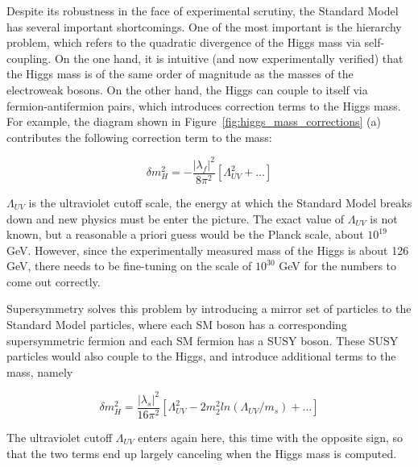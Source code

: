 Despite its robustness in the face of experimental scrutiny, the Standard Model has several important shortcomings.  One of the most important is the hierarchy problem, which refers to the quadratic divergence of the Higgs mass via self-coupling.  On the one hand, it is intuitive (and now experimentally verified) that the Higgs mass is of the same order of magnitude as the masses of the electroweak bosons.  On the other hand, the Higgs can couple to itself via fermion-antifermion pairs, which introduces correction terms to the Higgs mass.  For example, the diagram shown in Figure~\ref{fig:higgs_mass_corrections} (a) contributes the following correction term to the mass:

\begin{equation}
	\delta m_H^2 = -\frac{|\lambda_f |^2}{8\pi^2}[\Lambda_{UV}^2+\ldots]
\end{equation}

$\Lambda_{UV}$ is the ultraviolet cutoff scale, the energy at which the Standard Model breaks down and new physics must be enter the picture.  The exact value of $\Lambda_{UV}$ is not known, but a reasonable a priori guess would be the Planck scale, about $10^{19}$ GeV.  However, since the experimentally measured mass of the Higgs is about 126 GeV, there needs to be fine-tuning on the scale of $10^{30}$ GeV for the numbers to come out correctly.

Supersymmetry solves this problem by introducing a mirror set of particles to the Standard Model particles, where each SM boson has a corresponding supersymmetric fermion and each SM fermion has a SUSY boson.  These SUSY particles would also couple to the Higgs, and introduce additional terms to the mass, namely

\begin{equation}
	\delta m_H^2 = \frac{|\lambda_s |^2}{16\pi^2}[\Lambda_{UV}^2-2m_2^2ln(\Lambda_{UV}/m_s)+\ldots]
\end{equation}

The ultraviolet cutoff $\Lambda_{UV}$ enters again here, this time with the opposite sign, so that the two terms end up largely canceling when the Higgs mass is computed.  

